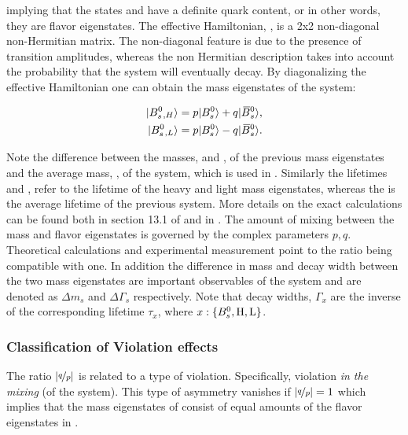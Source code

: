 \noindent implying that the states \Bs and \Bsb have a definite quark content, or in other words,
they are flavor eigenstates. The effective Hamiltonian, \Heff, is a 2x2 non-diagonal non-Hermitian matrix.
The non-diagonal feature is due to the presence of \BBbarSyst transition amplitudes,
whereas the non Hermitian description takes into account the probability that the system will
eventually decay. By diagonalizing the effective Hamiltonian one can obtain
the mass eigenstates of the system:

\begin{align}
  \centering
  \ket{\BsH} &= p \ket{\Bs} + q \ket{\Bsb}, \nonumber \\
  \ket{\BsL} &= p \ket{\Bs} - q \ket{\Bsb}.
  \label{bs_mass_eigen}
\end{align}

\noindent Note the difference between the masses, \mass{\BsH} and \mass{\BsL}, of the previous mass
eigenstates and the average mass, \mass{\Bs}, of the \BBbarSyst system, which is used in .
Similarly the lifetimes \tauH and \tauL, refer to the lifetime of the heavy and light mass eigenstates, whereas
the \tauBs is the average lifetime of the previous system. More details on the exact calculations can be found both in section 13.1
of \cite{PDG} and in \cite{jeroenThesis,DeBruyn-thesis}. The amount of mixing between the mass
and flavor eigenstates is governed by the complex parameters $p,q$.
Theoretical calculations \cite{Lenz:2011ti} and experimental measurement \cite{asl-paper} point to the ratio
\qoverp being compatible with one. In addition the difference in mass and decay width between the two mass
eigenstates are important observables of the \BBbarSyst system and are denoted as $\Delta m_s$ and $\Delta\Gamma_s$
respectively. Note that decay widths, $\Gamma_x$ are the inverse of the corresponding lifetime $\tau_x$, where $x:\{B^0_s,{\rm H},{\rm L}\}$.

\subsubsection{Classification of \CP Violation effects}
The ratio $|\nicefrac{q}{p}|$ is related to a type of \CP violation. Specifically,  \CP violation {\it in the mixing}
(of the \BBbarSyst system). This type of asymmetry vanishes if $|\nicefrac{q}{p}|= 1$ which implies that the mass
eigenstates of  consist of equal amounts of the flavor eigenstates in .

